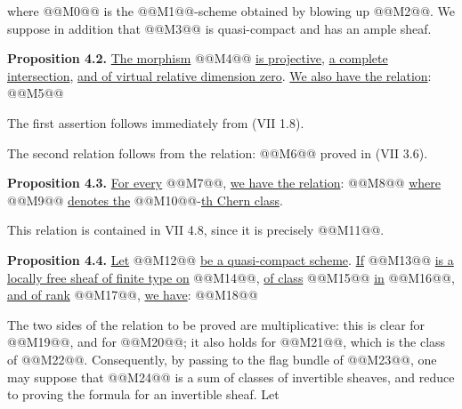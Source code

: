 where @@M0@@ is the @@M1@@-scheme
obtained by blowing up @@M2@@. We suppose in addition that @@M3@@ is quasi-compact and has an ample sheaf.

\textbf{Proposition 4.2.} \uline{The morphism} @@M4@@ \uline{is projective}, \uline{a complete intersection}, \uline{and of virtual relative dimension zero}. \uline{We also have the relation}:
@@M5@@

The first assertion follows immediately from (VII 1.8).

The second relation follows from the relation:
@@M6@@
proved in (VII 3.6).

\textbf{Proposition 4.3.} \uline{For every} @@M7@@, \uline{we have the relation}:
@@M8@@
\uline{where} @@M9@@ \uline{denotes the} @@M10@@-\uline{th Chern class}.

This relation is contained in VII 4.8, since it is precisely @@M11@@.

\textbf{Proposition 4.4.} \uline{Let} @@M12@@ \uline{be a quasi-compact scheme}. \uline{If} @@M13@@ \uline{is a locally free sheaf of finite type on} @@M14@@, \uline{of class} @@M15@@ \uline{in} @@M16@@, \uline{and of rank} @@M17@@, \uline{we have}:
@@M18@@

The two sides of the relation to be proved are multiplicative: this is clear for @@M19@@, and for @@M20@@; it also holds for @@M21@@, which is the class of @@M22@@. Consequently, by passing to the flag bundle of @@M23@@, one may suppose that @@M24@@ is a sum of classes of invertible sheaves, and reduce to proving the formula for an invertible sheaf. Let
